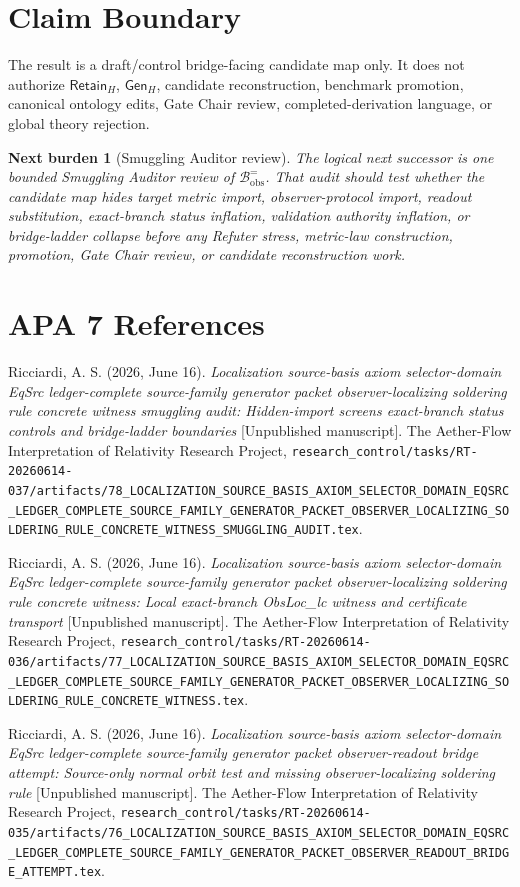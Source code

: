 \documentclass[11pt]{article}
\newcommand{\RetainH}{\mathsf{Retain}_{H}}
\newcommand{\GenH}{\mathsf{Gen}_{H}}
\newtheorem{nextburden}{Next burden}
\begin{document}
\section{Claim Boundary}

The result is a draft/control bridge-facing candidate map only. It
does not authorize \(\RetainH\), \(\GenH\), candidate reconstruction,
benchmark promotion, canonical ontology edits, Gate Chair review,
completed-derivation language, or global theory rejection.

\begin{nextburden}[Smuggling Auditor review]
The logical next successor is one bounded Smuggling Auditor review of
\(\mathcal{B}^{=}_{\mathrm{obs}}\). That audit should test whether the
candidate map hides target metric import, observer-protocol import,
readout substitution, exact-branch status inflation, validation
authority inflation, or bridge-ladder collapse before any Refuter
stress, metric-law construction, promotion, Gate Chair review, or
candidate reconstruction work.
\end{nextburden}

\section*{APA 7 References}

Ricciardi, A. S. (2026, June 16). \emph{Localization source-basis
axiom selector-domain EqSrc ledger-complete source-family generator
packet observer-localizing soldering rule concrete witness smuggling
audit: Hidden-import screens exact-branch status controls and
bridge-ladder boundaries} [Unpublished manuscript]. The Aether-Flow
Interpretation of Relativity Research Project,
\texttt{research\_control/tasks/RT-20260614-037/artifacts/78\_LOCALIZATION\_SOURCE\_BASIS\_AXIOM\_SELECTOR\_DOMAIN\_EQSRC\_LEDGER\_COMPLETE\_SOURCE\_FAMILY\_GENERATOR\_PACKET\_OBSERVER\_LOCALIZING\_SOLDERING\_RULE\_CONCRETE\_WITNESS\_SMUGGLING\_AUDIT.tex}.

Ricciardi, A. S. (2026, June 16). \emph{Localization source-basis
axiom selector-domain EqSrc ledger-complete source-family generator
packet observer-localizing soldering rule concrete witness: Local
exact-branch ObsLoc_lc witness and certificate transport}
[Unpublished manuscript]. The Aether-Flow Interpretation of
Relativity Research Project,
\texttt{research\_control/tasks/RT-20260614-036/artifacts/77\_LOCALIZATION\_SOURCE\_BASIS\_AXIOM\_SELECTOR\_DOMAIN\_EQSRC\_LEDGER\_COMPLETE\_SOURCE\_FAMILY\_GENERATOR\_PACKET\_OBSERVER\_LOCALIZING\_SOLDERING\_RULE\_CONCRETE\_WITNESS.tex}.

Ricciardi, A. S. (2026, June 16). \emph{Localization source-basis
axiom selector-domain EqSrc ledger-complete source-family generator
packet observer-readout bridge attempt: Source-only normal orbit test
and missing observer-localizing soldering rule} [Unpublished
manuscript]. The Aether-Flow Interpretation of Relativity Research
Project,
\texttt{research\_control/tasks/RT-20260614-035/artifacts/76\_LOCALIZATION\_SOURCE\_BASIS\_AXIOM\_SELECTOR\_DOMAIN\_EQSRC\_LEDGER\_COMPLETE\_SOURCE\_FAMILY\_GENERATOR\_PACKET\_OBSERVER\_READOUT\_BRIDGE\_ATTEMPT.tex}.
\end{document}
